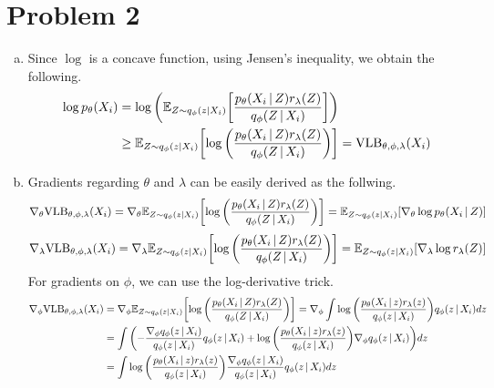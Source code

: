 \documentclass[10pt]{article}
\begin{document}
\section*{Problem 2}
\begin{enumerate}[(a)]
    \item Since $\log$ is a concave function, using Jensen's inequality, we obtain the following.
    \begin{align*}
        \log p_{\theta}\qty(X_i) &= \log\qty(\mathbb{E}_{Z \sim q_{\phi}(z|X_i)}\qty[\frac{p_{\theta}\qty(X_i \,|\, Z)r_\lambda\qty(Z)}{q_{\phi}\qty(Z \,|\, X_i)}]) \\
        &\geq \mathbb{E}_{Z \sim q_{\phi}(z|X_i)}\qty[\log\qty(\frac{p_{\theta}\qty(X_i \,|\, Z)r_\lambda\qty(Z)}{q_{\phi}\qty(Z \,|\, X_i)})] = \mathrm{VLB}_{\theta, \phi, \lambda}\qty(X_i)
    \end{align*}
    \item Gradients regarding $\theta$ and $\lambda$ can be easily derived as the follwing.
    $$\nabla_{\theta}\mathrm{VLB}_{\theta, \phi, \lambda}\qty(X_i) = \nabla_{\theta}\mathbb{E}_{Z \sim q_{\phi}(z|X_i)}\qty[\log\qty(\frac{p_{\theta}\qty(X_i \,|\, Z)r_\lambda\qty(Z)}{q_{\phi}\qty(Z \,|\, X_i)})] = \mathbb{E}_{Z \sim q_{\phi}(z|X_i)}\qty[\nabla_{\theta}\log{p_{\theta}\qty(X_i \,|\, Z)}]$$
    $$\nabla_{\lambda}\mathrm{VLB}_{\theta, \phi, \lambda}\qty(X_i) = \nabla_{\lambda}\mathbb{E}_{Z \sim q_{\phi}(z|X_i)}\qty[\log\qty(\frac{p_{\theta}\qty(X_i \,|\, Z)r_\lambda\qty(Z)}{q_{\phi}\qty(Z \,|\, X_i)})] = \mathbb{E}_{Z \sim q_{\phi}(z|X_i)}\qty[\nabla_{\lambda}\log{r_{\lambda}\qty(Z)}]$$
    For gradients on $\phi$, we can use the log-derivative trick.
    \begin{align*}
        \nabla_{\phi}\mathrm{VLB}_{\theta, \phi, \lambda}\qty(X_i) &= \nabla_{\phi}\mathbb{E}_{Z \sim q_{\phi}(z|X_i)}\qty[\log\qty(\frac{p_{\theta}\qty(X_i \,|\, Z)r_\lambda\qty(Z)}{q_{\phi}\qty(Z \,|\, X_i)})] = \nabla_{\phi}\int\log\qty(\frac{p_{\theta}\qty(X_i \,|\, z)r_\lambda\qty(z)}{q_{\phi}\qty(z \,|\, X_i)})q_{\phi}\qty(z \,|\, X_i)dz \\
        &= \int \qty(-\frac{\nabla_{\phi}q_\phi\qty(z \,|\, X_i)}{q_\phi\qty(z \,|\, X_i)}q_\phi\qty(z \,|\, X_i) + \log\qty(\frac{p_{\theta}\qty(X_i \,|\, z)r_\lambda\qty(z)}{q_{\phi}\qty(z \,|\, X_i)})\nabla_{\phi}q_\phi\qty(z \,|\, X_i))dz \\
        &= \int \log\qty(\frac{p_{\theta}\qty(X_i \,|\, z)r_\lambda\qty(z)}{q_{\phi}\qty(z \,|\, X_i)})\frac{\nabla_{\phi}q_\phi\qty(z \,|\, X_i)}{q_\phi\qty(z \,|\, X_i)}q_\phi\qty(z \,|\, X_i)dz \\

\end{align*}
\end{enumerate}
\end{document}
